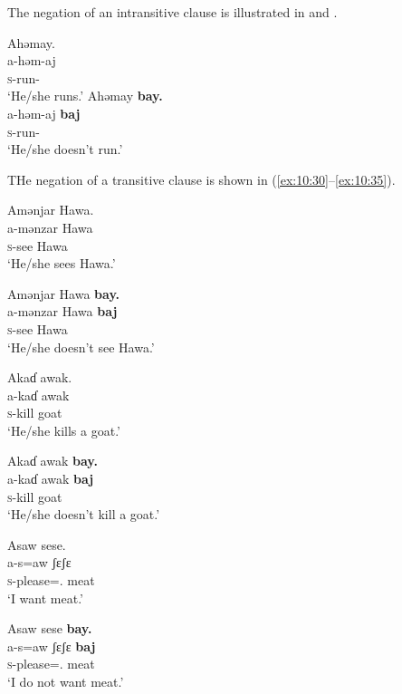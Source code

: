 The negation of an intransitive clause is illustrated in  and . 

\ea \label{ex:10:28}
Ahəmay.\\
\gll  a-həm-aj\\
      \textsc{s}-run-{\CL}\\
\glt  ‘He/she runs.’            
\z
\clearpage
\ea \label{ex:10:29}
Ahəmay  \textbf{bay.}\\
\gll  a-həm-aj     \textbf{baj}\\
      \textsc{s}-run-{\CL}    {\NEG}\\
\glt  ‘He/she doesn’t run.’
\z

THe negation of a transitive clause is shown in (\ref{ex:10:30}--\ref{ex:10:35}).

\ea \label{ex:10:30}
Amənjar  Hawa. \\
\gll  a-mənzar   Hawa\\
      \textsc{s}-see  Hawa\\
\glt  ‘He/she sees Hawa.’           
\z

\ea \label{ex:10:31}
Amənjar  Hawa  \textbf{bay.}\\
\gll  a-mənzar   Hawa   \textbf{baj}\\
      \textsc{s}-see  Hawa  {\NEG}\\
\glt  ‘He/she doesn’t see Hawa.’
\z

\ea \label{ex:10:32}
Akaɗ  awak.\\
\gll  a-kaɗ   awak\\
      \textsc{s}-kill  goat\\
\glt  ‘He/she kills a goat.’          
\z

\ea \label{ex:10:33}
Akaɗ  awak  \textbf{bay.}\\
\gll  a-kaɗ   awak   \textbf{baj}\\
      \textsc{s}-kill  goat  {\NEG}\\
\glt  ‘He/she doesn’t kill a goat.’
\z

\ea \label{ex:10:34}
Asaw sese.\\
\gll  a-s=aw  ʃɛʃɛ\\
      \textsc{s}-please={\oneS}.{\IO}  meat\\
\glt  ‘I want meat.’            
\z

\ea \label{ex:10:35}
Asaw  sese  \textbf{bay.}\\
\gll  a-s=aw     ʃɛʃɛ   \textbf{baj}\\
      \textsc{s}-please={\oneS}.{\IO}   meat  {\NEG}\\
\glt  ‘I do not want meat.’
\z

